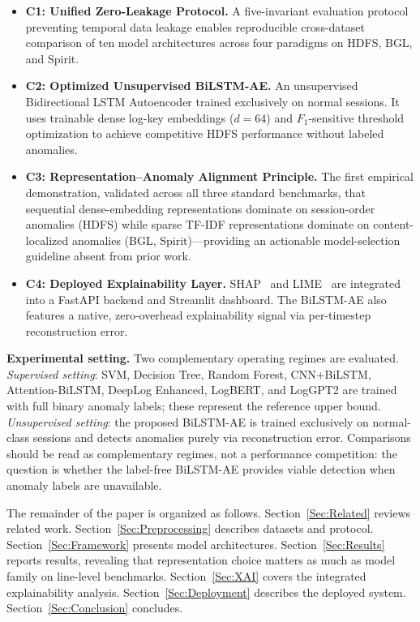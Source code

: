 \documentclass{elektr}
\begin{document}
\begin{itemize}
    \item \textbf{C1: Unified Zero-Leakage Protocol.}
    A five-invariant evaluation protocol preventing temporal data leakage enables
    reproducible cross-dataset comparison of ten model architectures across
    four paradigms on HDFS, BGL, and Spirit.

    \item \textbf{C2: Optimized Unsupervised BiLSTM-AE.}
    An unsupervised Bidirectional LSTM Autoencoder trained exclusively on normal
    sessions. It uses trainable dense log-key embeddings ($d{=}64$) and
    $F_1$-sensitive threshold optimization to achieve competitive HDFS performance without labeled anomalies.

    \item \textbf{C3: Representation--Anomaly Alignment Principle.}
    The first empirical demonstration, validated across all three standard benchmarks,
    that sequential dense-embedding representations dominate on session-order anomalies
    (HDFS) while sparse TF-IDF representations dominate on content-localized anomalies
    (BGL, Spirit)---providing an actionable model-selection guideline absent from prior work.

    \item \textbf{C4: Deployed Explainability Layer.}
    SHAP~\cite{ref9} and LIME~\cite{ref10} are integrated into a FastAPI backend
    and Streamlit dashboard. The BiLSTM-AE also features a native,
    zero-overhead explainability signal via per-timestep reconstruction error.
\end{itemize}

\textbf{Experimental setting.} Two complementary operating regimes are evaluated.
\emph{Supervised setting}: SVM, Decision Tree, Random Forest, CNN+BiLSTM,
Attention-BiLSTM, DeepLog Enhanced, LogBERT, and LogGPT2 are trained with full
binary anomaly labels; these represent the reference upper bound. \emph{Unsupervised setting}: the proposed BiLSTM-AE is
trained exclusively on normal-class sessions and detects anomalies purely via
reconstruction error. Comparisons should be read as complementary regimes, not a
performance competition: the question is whether the label-free BiLSTM-AE
provides viable detection when anomaly labels are unavailable.

The remainder of the paper is organized as follows. Section~\ref{Sec:Related}
reviews related work. Section~\ref{Sec:Preprocessing} describes datasets and
protocol. Section~\ref{Sec:Framework} presents model architectures.
Section~\ref{Sec:Results} reports results, revealing that representation choice
matters as much as model family on line-level benchmarks.
Section~\ref{Sec:XAI} covers the integrated explainability analysis.
Section~\ref{Sec:Deployment} describes the deployed system.
Section~\ref{Sec:Conclusion} concludes.
\end{document}
